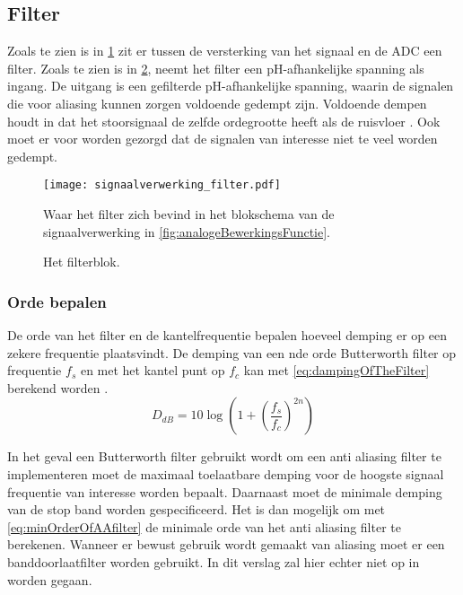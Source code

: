 \subsection{Filter}
Zoals te zien is in \cref{fig:filterInSchema} zit er tussen de versterking van het signaal en de ADC een filter. Zoals te zien is in \cref{fig:filterBlok}, neemt het filter een pH-afhankelijke spanning als ingang. De uitgang is een gefilterde pH-afhankelijke spanning, waarin de signalen die voor aliasing kunnen zorgen voldoende gedempt zijn. Voldoende dempen houdt in dat het stoorsignaal de zelfde ordegrootte heeft als de ruisvloer \cite{energieZuinigeSystemenOntwerpen}. Ook moet er voor worden gezorgd dat de signalen van interesse niet te veel worden gedempt.
\begin{figure}[!htbp]
    \centering
    \texttt{[image: signaalverwerking\_filter.pdf]}
    \caption{Waar het filter zich bevind in het blokschema van de signaalverwerking in \cref{fig:analogeBewerkingsFunctie}.}
    \label{fig:filterInSchema}
\end{figure}

\begin{figure}[!htbp]
    \centering
    \def\svgwidth{0.4\textwidth}
    
    \caption{Het filterblok.}
    \label{fig:filterBlok}
\end{figure}


\subsubsection{Orde bepalen} \label{sec:DetermineAAorder}
De orde van het filter en de kantelfrequentie bepalen hoeveel demping er op een zekere frequentie plaatsvindt. De demping van een nde orde Butterworth filter op frequentie $f_s$ en met het kantel punt op $f_c$ kan met \cref{eq:dampingOfTheFilter} berekend worden \cite{electronicFilterDesignHandbook}.
\begin{equation} \label{eq:dampingOfTheFilter}
    D_{dB}=10\log\left(1+\left(\frac{f_s}{f_c}\right)^{2n}\right)
\end{equation}

In het geval een Butterworth filter gebruikt wordt om een anti aliasing filter te implementeren moet de maximaal toelaatbare demping voor de hoogste signaal frequentie van interesse worden bepaalt. Daarnaast moet de minimale demping van de stop band worden gespecificeerd. Het is dan mogelijk om met \cref{eq:minOrderOfAAfilter} de minimale orde van het anti aliasing filter te berekenen.
Wanneer er bewust gebruik wordt gemaakt van aliasing moet er een banddoorlaatfilter worden gebruikt. In dit verslag zal hier echter niet op in worden gegaan.

